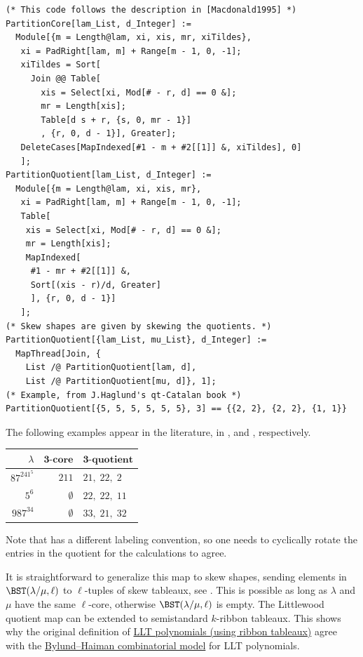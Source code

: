 \begin{lstlisting}
(* This code follows the description in [Macdonald1995] *)
PartitionCore[lam_List, d_Integer] := 
  Module[{m = Length@lam, xi, xis, mr, xiTildes},
   xi = PadRight[lam, m] + Range[m - 1, 0, -1];
   xiTildes = Sort[
     Join @@ Table[
       xis = Select[xi, Mod[# - r, d] == 0 &];
       mr = Length[xis];
       Table[d s + r, {s, 0, mr - 1}]
       , {r, 0, d - 1}], Greater];
   DeleteCases[MapIndexed[#1 - m + #2[[1]] &, xiTildes], 0]
   ];
PartitionQuotient[lam_List, d_Integer] := 
  Module[{m = Length@lam, xi, xis, mr},
   xi = PadRight[lam, m] + Range[m - 1, 0, -1];
   Table[
    xis = Select[xi, Mod[# - r, d] == 0 &];
    mr = Length[xis];
    MapIndexed[
     #1 - mr + #2[[1]] &,
     Sort[(xis - r)/d, Greater]
     ], {r, 0, d - 1}]
   ];
(* Skew shapes are given by skewing the quotients. *)
PartitionQuotient[{lam_List, mu_List}, d_Integer] :=
  MapThread[Join, {
    List /@ PartitionQuotient[lam, d],
    List /@ PartitionQuotient[mu, d]}, 1];
(* Example, from J.Haglund's qt-Catalan book *)
PartitionQuotient[{5, 5, 5, 5, 5, 5}, 3] == {{2, 2}, {2, 2}, {1, 1}}
\end{lstlisting}

\begin{example}
The following examples appear in the literature,
in \cite[p.13]{Lascoux97ribbontableaux}, \cite[p.94]{qtCatalanBook} and  \cite[Fig. 2.6]{Pak2000Ribbon},
respectively.

\begin{tabular}{rrl}
\toprule
 $\lambda$ & $\textbf{3-core}$ & $\textbf{3-quotient}$  \\
\midrule
$87^241^5$ & $211$ & $21,\; 22,\; 2$ \\
$5^6$ & $\emptyset$ & $22,\; 22,\; 11$   \\
$987^34$ & $\emptyset$ &  $33,\; 21,\; 32$  \\
\bottomrule
\end{tabular}
Note that  has a different labeling convention, so one 
needs to cyclically rotate the entries in the quotient for the calculations to agree.
\end{example}

It is straightforward to generalize this map to skew shapes,
sending elements in $\BST(\lambda/\mu,\ell)$ to $\ell$-tuples of skew tableaux,
see \cite{Wildon2018}. This is possible as long as $\lambda$ and $\mu$ have the same $\ell$-core,
otherwise $\BST(\lambda/\mu,\ell)$ is empty.
The Littlewood quotient map can be extended to 
semistandard $k$-ribbon tableaux.
This shows why the original definition 
of \hyperref[lltDefinitionRibbons]{LLT polynomials (using ribbon tableaux)} agree 
with the \hyperref[lltDefinitionTuples]{Bylund--Haiman combinatorial model} for LLT polynomials.


